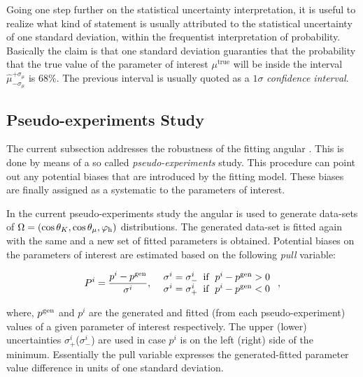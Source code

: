 Going one step further on the statistical uncertainty interpretation, it is useful to realize what kind of statement is
usually attributed to the statistical uncertainty of one standard deviation, within the frequentist interpretation of
probability. Basically the claim is that one standard deviation guaranties that the probability that the true value
of the parameter of interest $\mu^{\text{true}}$ will be inside the interval $\hat{\mu}_{-\sigma_\mu}^{+\sigma_\mu}$ is $68\%$.
The previous interval is usually quoted as a $1\sigma$ {\it confidence interval}.


\subsection{Pseudo-experiments Study}
\label{Toy_Experiments_Study}

The current subsection addresses the robustness of the fitting angular \pdf.
This is done by means of a so called {\it pseudo-experiments} study. This procedure
can point out any potential biases that are introduced by the fitting model.
These biases are finally assigned as a systematic to the parameters of interest.

In the current pseudo-experiments study the angular \pdf is used to generate data-sets of $\Omega = (\cos\theta_{K},\cos\theta_{\mu},\varphi_{\rm h})$
distributions. The generated data-set is fitted again with the same \pdf and a new set of fitted parameters is obtained. Potential
biases on the parameters of interest are estimated based on the following {\it pull} variable:

\begin{equation}
P^i = \frac{p^i - p^{\rm gen}}{ \sigma^i },\;\;\left.
  \begin{array}{ll}
    \sigma^i = \sigma^i_- \;\;{\rm if}\;\; p^i - p^{\rm gen} > 0   \\
    \sigma^i = \sigma^i_+ \;\;{\rm if}\;\; p^i - p^{\rm gen} < 0
  \end{array} \right. ,
\label{pull_def}
\end{equation}

\noindent where, $p^{\rm gen}$ and $p^i$ are the generated and fitted (from each pseudo-experiment) values of a given parameter of interest
respectively. The upper (lower) uncertainties $\sigma^i_+$($\sigma^i_-$) are used in case $p^i$ is on the left (right) side of the minimum.
Essentially the pull variable expresses the generated-fitted parameter value difference in units of one standard deviation.

